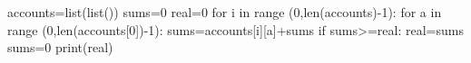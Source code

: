accounts=list(list())
sums=0
real=0
for i in range (0,len(accounts)-1):
     for a in range (0,len(accounts[0])-1):
        sums=accounts[i][a]+sums    
    if sums>=real:
         real=sums
    sums=0
print(real)
            